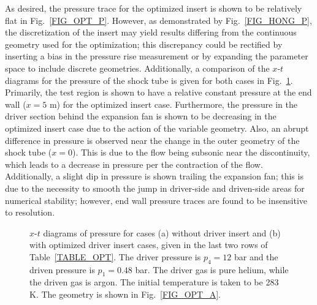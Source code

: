 As desired, the pressure trace for the optimized insert is shown to be relatively flat in Fig.~\ref{FIG_OPT_P}. However, as demonstrated by Fig.~\ref{FIG_HONG_P}, the discretization of the insert may yield results differing from the continuous geometry used for the optimization; this discrepancy could be rectified by inserting a bias in the pressure rise measurement or by expanding the parameter space to include discrete geometries. Additionally, a comparison of the $x$-$t$ diagrams for the pressure of the shock tube is given for both cases in Fig.~\ref{FIG_XTOPT}. Primarily, the test region is shown to have a relative constant pressure at the end wall ($x=5$ m) for the optimized insert case. Furthermore, the pressure in the driver section behind the expansion fan is shown to be decreasing in the optimized insert case due to the action of the variable geometry. Also, an abrupt difference in pressure is observed near the change in the outer geometry of the shock tube ($x=0$). This is due to the flow being subsonic near the discontinuity, which leads to a decrease in pressure per the contraction of the flow. Additionally, a slight dip in pressure is shown trailing the expansion fan; this is due to the necessity to smooth the jump in driver-side and driven-side areas for numerical stability; however, end wall pressure traces are found to be insensitive to resolution.

\begin{figure}[!ht!]
	\centering
	\caption{\label{FIG_XTOPT}$x$-$t$ diagrams of pressure for cases (a) without driver insert and (b) with optimized driver insert cases, given in the last two rows of Table~\ref{TABLE_OPT}. The driver pressure is $p_4=12$ bar and the driven pressure is $p_1=0.48$ bar. The driver gas is pure helium, while the driven gas is argon. The initial temperature is taken to be 283 K. The geometry is shown in Fig.~\ref{FIG_OPT_A}.}
\end{figure}

